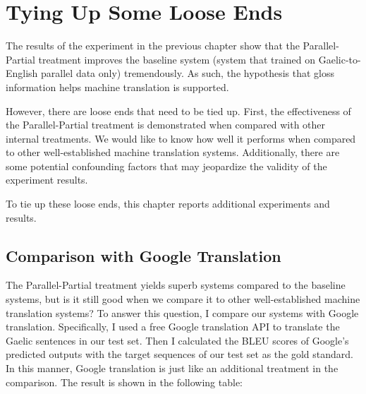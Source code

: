\documentclass[final]{ua-thesis}
\numberwithin{equation}{section}
\begin{document}


\chapter{Tying Up Some Loose Ends}
\label{chap:Tying_Up}

The results of the experiment in the previous chapter show that the Parallel-Partial treatment improves the baseline system (system that trained on Gaelic-to-English parallel data only) tremendously. As such, the hypothesis that gloss information helps machine translation is supported.

However, there are loose ends that need to be tied up. First, the effectiveness of the Parallel-Partial treatment is demonstrated when compared with other internal treatments. We would like to know how well it performs when compared to other well-established machine translation systems.       
Additionally, there are some potential confounding factors that may jeopardize the validity of the experiment results. 

To tie up these loose ends, this chapter reports additional experiments and results.

\section{Comparison with Google Translation}
The Parallel-Partial treatment yields superb systems compared to the baseline systems, but is it still good when we compare it to other well-established machine translation systems? 
To answer this question, I compare our systems with Google translation.
Specifically, I used a free Google translation API \citep{google_api} to translate the Gaelic sentences in our test set. 
Then I calculated the BLEU scores of Google's predicted outputs with the target sequences of our test set as the gold standard. In this manner, Google translation is just like an additional treatment in the comparison. The result is shown in the following table:
\end{document}
